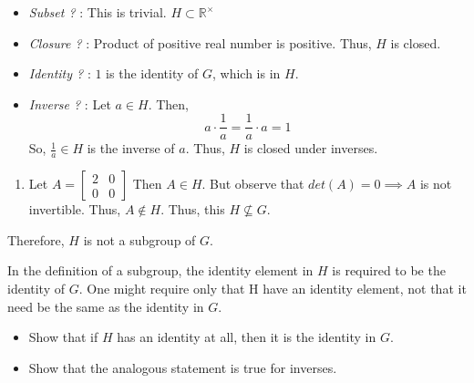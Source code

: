 \documentclass[
]{book}
\providecommand{\tightlist}{%
  \setlength{\itemsep}{0pt}\setlength{\parskip}{0pt}}
\begin{document}
\begin{itemize}
\item
  \emph{Subset ?} : This is trivial. \(H \subset \mathbb{R}^\times\)
\item
  \emph{Closure ?} : Product of positive real number is positive. Thus,
  \(H\) is closed.
\item
  \emph{Identity ?} : \(1\) is the identity of \(G\), which is in \(H\).
\item
  \emph{Inverse ?} : Let \(a\in H\). Then,
  \[a\cdot \frac{1}{a}=\frac{1}{a}\cdot a=1\] So, \(\frac{1}{a}\in H\)
  is the inverse of \(a\). Thus, \(H\) is closed under inverses.
\end{itemize}

\begin{enumerate}
\def\labelenumi{(\alph{enumi})}
\setcounter{enumi}{4}
\tightlist
\item
  Let \(A=\begin{bmatrix} 2 & 0 \\ 0 & 0 \end{bmatrix}\) Then
  \(A\in H\). But observe that \(det(A)=0\implies A\) is not invertible.
  Thus, \(A\not\in H\). Thus, this \(H \not\subseteq G\).
\end{enumerate}

Therefore, \(H\) is not a subgroup of \(G\).

\leavevmode{}%
In the definition of a subgroup, the identity element in \(H\) is
required to be the identity of \(G\). One might require only that H have
an identity element, not that it need be the same as the identity in
\(G\).

\begin{itemize}
\tightlist
\item
  Show that if \(H\) has an identity at all, then it is the identity in
  \(G\).
\item
  Show that the analogous statement is true for inverses.
\end{itemize}
\end{document}
